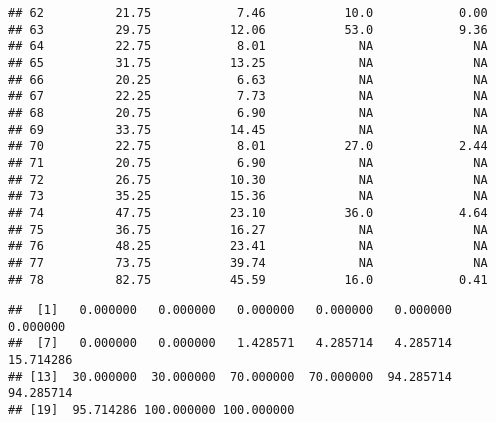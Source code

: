 \documentclass[]{article}
\newenvironment{Shaded}{\begin{snugshade}}{\end{snugshade}}
\newcommand{\CommentTok}[1]{\textcolor[rgb]{0.56,0.35,0.01}{\textit{#1}}}
\newcommand{\ControlFlowTok}[1]{\textcolor[rgb]{0.13,0.29,0.53}{\textbf{#1}}}
\newcommand{\DataTypeTok}[1]{\textcolor[rgb]{0.13,0.29,0.53}{#1}}
\newcommand{\DecValTok}[1]{\textcolor[rgb]{0.00,0.00,0.81}{#1}}
\newcommand{\KeywordTok}[1]{\textcolor[rgb]{0.13,0.29,0.53}{\textbf{#1}}}
\newcommand{\NormalTok}[1]{#1}
\newcommand{\OperatorTok}[1]{\textcolor[rgb]{0.81,0.36,0.00}{\textbf{#1}}}
\newcommand{\StringTok}[1]{\textcolor[rgb]{0.31,0.60,0.02}{#1}}
\begin{document}
\begin{verbatim}
## 62          21.75            7.46           10.0            0.00
## 63          29.75           12.06           53.0            9.36
## 64          22.75            8.01             NA              NA
## 65          31.75           13.25             NA              NA
## 66          20.25            6.63             NA              NA
## 67          22.25            7.73             NA              NA
## 68          20.75            6.90             NA              NA
## 69          33.75           14.45             NA              NA
## 70          22.75            8.01           27.0            2.44
## 71          20.75            6.90             NA              NA
## 72          26.75           10.30             NA              NA
## 73          35.25           15.36             NA              NA
## 74          47.75           23.10           36.0            4.64
## 75          36.75           16.27             NA              NA
## 76          48.25           23.41             NA              NA
## 77          73.75           39.74             NA              NA
## 78          82.75           45.59           16.0            0.41
\end{verbatim}

\begin{Shaded}
\end{Shaded}

\begin{verbatim}
##  [1]   0.000000   0.000000   0.000000   0.000000   0.000000   0.000000
##  [7]   0.000000   0.000000   1.428571   4.285714   4.285714  15.714286
## [13]  30.000000  30.000000  70.000000  70.000000  94.285714  94.285714
## [19]  95.714286 100.000000 100.000000
\end{verbatim}
\end{document}
